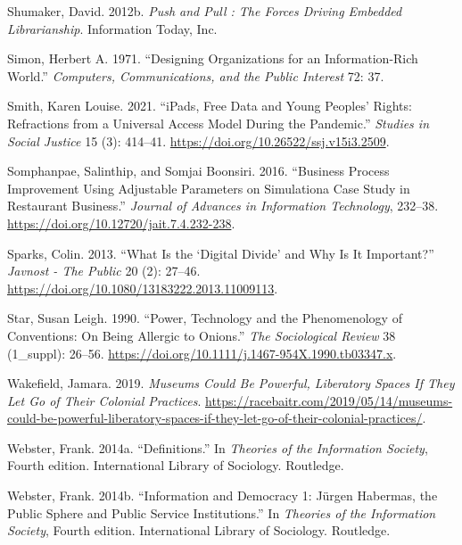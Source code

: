 \documentclass[
  letterpaper,
  DIV=11,
  numbers=noendperiod]{scrreprt}
\newlength{\cslhangindent}
\newenvironment{CSLReferences}[2] %
 {\begin{list}{}{%
  \setlength{\itemindent}{0pt}
  \setlength{\leftmargin}{0pt}
  \setlength{\parsep}{0pt}
  \ifodd #1
   \setlength{\leftmargin}{\cslhangindent}
   \setlength{\itemindent}{-1\cslhangindent}
  \fi
  \setlength{\itemsep}{#2\baselineskip}}}
 {\end{list}}
\begin{document}
\begin{CSLReferences}{1}{1}
Shumaker, David. 2012b. \emph{Push and Pull : The Forces Driving
Embedded Librarianship}. Information Today, Inc.

Simon, Herbert A. 1971. {``Designing Organizations for an
Information-Rich World.''} \emph{Computers, Communications, and the
Public Interest} 72: 37.

Smith, Karen Louise. 2021. {``{iPads}, {Free} {Data} and {Young}
{Peoples}' {Rights}: {Refractions} from a {Universal} {Access} {Model}
{During} the {Pandemic}.''} \emph{Studies in Social Justice} 15 (3):
414--41. \url{https://doi.org/10.26522/ssj.v15i3.2509}.

Somphanpae, Salinthip, and Somjai Boonsiri. 2016. {``Business Process
Improvement Using Adjustable Parameters on Simulation{\textendash}a Case
Study in Restaurant Business.''} \emph{Journal of Advances in
Information Technology}, 232--38.
\url{https://doi.org/10.12720/jait.7.4.232-238}.

Sparks, Colin. 2013. {``What Is the {`{Digital} {Divide}'} and Why Is It
{Important}?''} \emph{Javnost - The Public} 20 (2): 27--46.
\url{https://doi.org/10.1080/13183222.2013.11009113}.

Star, Susan Leigh. 1990. {``Power, {Technology} and the {Phenomenology}
of {Conventions}: {On} Being {Allergic} to {Onions}.''} \emph{The
Sociological Review} 38 (1\_suppl): 26--56.
\url{https://doi.org/10.1111/j.1467-954X.1990.tb03347.x}.

Wakefield, Jamara. 2019. \emph{Museums Could Be Powerful, Liberatory
Spaces If They Let Go of Their Colonial Practices}.
\url{https://racebaitr.com/2019/05/14/museums-could-be-powerful-liberatory-spaces-if-they-let-go-of-their-colonial-practices/}.

Webster, Frank. 2014a. {``Definitions.''} In \emph{Theories of the
Information Society}, Fourth edition. International Library of
Sociology. Routledge.

Webster, Frank. 2014b. {``Information and Democracy 1: {Jürgen}
{Habermas}, the Public Sphere and Public Service Institutions.''} In
\emph{Theories of the Information Society}, Fourth edition.
International Library of Sociology. Routledge.


\end{CSLReferences}
\end{document}
